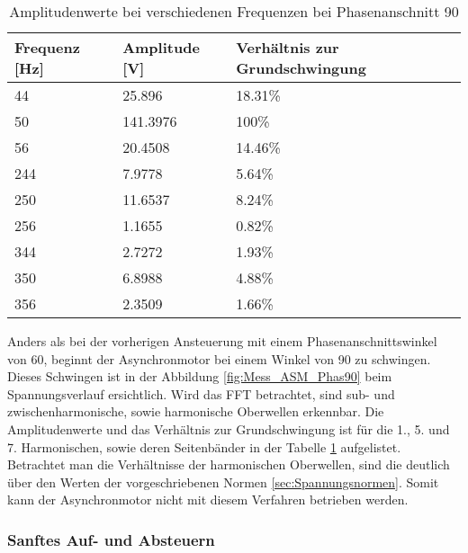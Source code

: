\begin{table}[ht!]
	\centering
	\begin{tabular}{|l|l|l|}
		\hline
		Frequenz {[}Hz{]} & Amplitude {[}V{]} & Verhältnis zur Grundschwingung \\ \hline
		44                & 25.896            & 18.31\%                        \\ \hline
		50                & 141.3976          & 100\%                          \\ \hline
		56                & 20.4508           & 14.46\%                        \\ \hline
		244               & 7.9778            & 5.64\%                         \\ \hline
		250               & 11.6537           & 8.24\%                         \\ \hline
		256               & 1.1655            & 0.82\%                         \\ \hline
		344               & 2.7272            & 1.93\%                         \\ \hline
		350               & 6.8988            & 4.88\%                         \\ \hline
		356               & 2.3509            & 1.66\%                         \\ \hline
	\end{tabular}
\caption{Amplitudenwerte bei verschiedenen Frequenzen bei Phasenanschnitt 90\textdegree}\label{tab:Mess_Spannung_ASM_Phas90}
\end{table}

Anders als bei der vorherigen Ansteuerung mit einem Phasenanschnittswinkel von 60\textdegree, beginnt der Asynchronmotor bei einem Winkel von 90\textdegree \hspace{0.02cm} zu schwingen. Dieses Schwingen ist in der Abbildung \ref{fig:Mess_ASM_Phas90} beim Spannungsverlauf ersichtlich. Wird das FFT betrachtet, sind sub- und zwischenharmonische, sowie harmonische Oberwellen erkennbar. Die Amplitudenwerte und das Verhältnis zur Grundschwingung ist für die 1., 5. und 7. Harmonischen, sowie deren Seitenbänder in der Tabelle \ref{tab:Mess_Spannung_ASM_Phas90} aufgelistet. Betrachtet man die Verhältnisse der harmonischen Oberwellen, sind die deutlich über den Werten der vorgeschriebenen Normen \ref{sec:Spannungsnormen}. Somit kann der Asynchronmotor nicht mit diesem Verfahren betrieben werden.  


\newpage
\subsubsection*{Sanftes Auf- und Absteuern}

